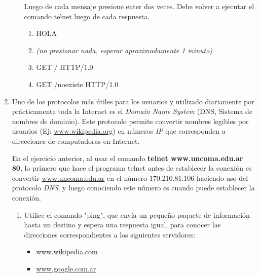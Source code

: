 \documentclass[12pt]{article}
\begin{document}
\begin{enumerate}
\begin{enumerate}
            Luego de cada mensaje presione enter dos veces. Debe volver a
            ejecutar el comando telnet luego de cada respuesta.

        \begin{enumerate}
                
            \item HOLA

            \item \emph{(no presionar nada, esperar aproximadamente 1 minuto)}

            \item GET / HTTP/1.0

            \item GET /noexiste HTTP/1.0

        \end{enumerate}

    \end{enumerate}

    \item Uno de los protocolos más útiles para los usuarios y utilizado
        diariamente por prácticamente toda la Internet es el \emph{Domain Name
        System} (DNS, Sistema de nombres de dominio). Este protocolo permite
        convertir nombres legibles por usuarios (Ej: \url{www.wikipedia.org})
        en números \emph{IP} que corresponden a direcciones de computadoras en
        Internet.

        En el ejercicio anterior, al usar el comando \textbf{telnet
        www.uncoma.edu.ar 80}, lo primero que hace el programa telnet antes de
        establecer la conexión es convertir \url{www.uncoma.edu.ar} en el
        número 170.210.81.106 haciendo uso del protocolo \emph{DNS}, y luego
        conociendo este número es cuando puede establecer la conexión.

        \begin{enumerate}

            \item Utilice el comando "ping", que envía un pequeño paquete de
                información hasta un destino y espera una respuesta igual,
                para conocer las direcciones correspondientes a los siguientes
                servidores: 

            \begin{itemize}

                \item \url{www.wikipedia.com}

                \item \url{www.google.com.ar}


\end{itemize}
\end{enumerate}
\end{enumerate}
\end{document}
